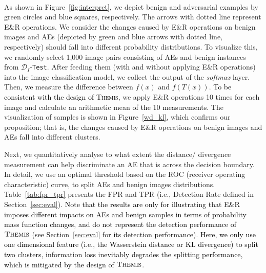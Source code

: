 \documentclass[sigconf]{acmart}
\newcommand{\oursys}{\textsc{Themis}\xspace}
\newcommand{\zedit}[1]{\textcolor{black}{#1}}
\newcommand{\fedit}[1]{\textcolor{black}{#1}}
\begin{document}
\begin{figure*}[!thb]
\centering
{}\quad
{}\\
\quad
{}

\caption{Visualization of the changes caused by E\&R on benign samples and AEs.}\label{wd_kl}
\end{figure*}

As shown in Figure~\ref{fig:interpret}, we depict benign and adversarial examples by green circles and blue squares, respectively. The arrows with dotted line represent E\&R operations. 
We consider the changes caused by E\&R operations on benign images and AEs (depicted by green and blue arrows with dotted line, respectively) should fall into different probability distributions. To visualize this, we randomly select 1,000 image pairs consisting of AEs and benign instances from $\mathcal{D}_I$-\texttt{Test}. After feeding them (with and without applying E\&R operations) into the image classification model, we collect the output of the \textit{softmax} layer. Then, we measure the difference between $f(x)$ and $f(T(x))$. \zedit{To be consistent with the design of \oursys}, we apply E\&R operations 10 times for each image and calculate an arithmetic mean \zedit{of the 10 measurements}. The visualization of samples is shown in Figure~\ref{wd_kl}, which confirms our proposition; that is, the changes caused by E\&R operations on benign images and AEs fall into different clusters.

Next, we quantitatively analyse to what extent the distance/ divergence measurement 
can help discriminate an AE that is across the decision boundary. In detail, we use an optimal threshold based on the ROC (receiver operating characteristic) curve, to split AEs and benign images distributions. Table~\ref{tab:fpr_tpr} presents the FPR and TPR (i.e., Detection Rate defined in Section~\ref{sec:eval}). \zedit{Note that the results are only for illustrating that E\&R imposes different impacts
on AEs and benign samples in terms of} \fedit{probability mass function} 
\zedit{changes, and do not represent the detection
performance of $\oursys$ (see Section~\ref{sec:eval} for its detection performance). 
Here, we only}
\fedit{use} 
\zedit{one dimensional feature (i.e., the Wasserstein distance or KL divergence)}
\fedit{to split two clusters,}
\zedit{information loss inevitably degrades the}
\fedit{splitting} 
\zedit{performance, which is mitigated by the design of $\oursys$.}
\end{document}
